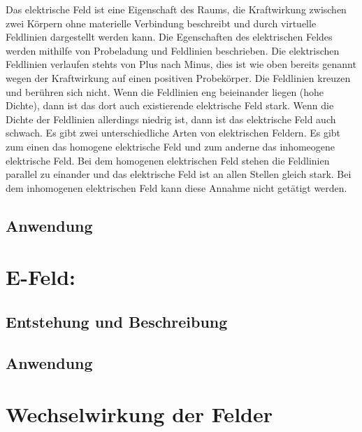 Das elektrische Feld ist eine Eigenschaft des Raums, die Kraftwirkung zwischen zwei Körpern ohne materielle Verbindung beschreibt und durch virtuelle Feldlinien dargestellt werden kann. 
Die Egenschaften des elektrischen Feldes werden mithilfe von Probeladung und Feldlinien beschrieben.
Die elektrischen Feldlinien verlaufen stehts von Plus nach Minus, dies ist wie oben bereits genannt wegen der Kraftwirkung auf einen positiven Probekörper.
Die Feldlinien kreuzen und berühren sich nicht.
Wenn die Feldlinien eng beieinander liegen (hohe Dichte), dann ist das dort auch existierende elektrische Feld stark.
Wenn die Dichte der Feldlinien allerdings niedrig ist, dann ist das elektrische Feld auch schwach.
Es gibt zwei unterschiedliche Arten von elektrischen Feldern. 
Es gibt zum einen das homogene elektrische Feld und zum anderne das inhomeogene elektrische Feld.
Bei dem homogenen elektrischen Feld stehen die Feldlinien parallel zu einander und das elektrische Feld ist an allen Stellen gleich stark.
Bei dem inhomogenen elektrischen Feld kann diese Annahme nicht getätigt werden.

\subsection{Anwendung}

\section{E-Feld:}
\subsection{Entstehung und Beschreibung}
\subsection{Anwendung}
\section{Wechselwirkung der Felder}%